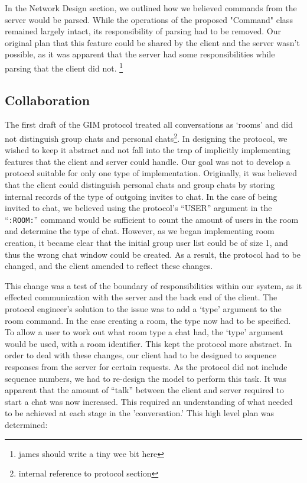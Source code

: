 In the Network Design section, we outlined how we believed commands from the server would be parsed. While the operations of the proposed "Command" class remained largely intact, its responsibility of parsing had to be removed. Our original plan that this feature could be shared by the client and the server wasn't possible, as it was apparent that the server had some responsibilities while parsing that the client did not. \footnote{james should write a tiny wee bit here}


\subsection{Collaboration}

The first draft of the GIM protocol treated all conversations as `rooms' and did not distinguish group chats and personal chats\footnote{internal reference to protocol section}. In designing the protocol, we wished to keep it abstract and not fall into the trap of implicitly implementing features that the client and server could handle. Our goal was not to develop a protocol suitable for only one type of implementation. Originally, it was believed that the client could distinguish personal chats and group chats by storing internal records of the type of outgoing invites to chat. In the case of being invited to chat, we believed using the protocol's ``USER'' argument in the ``\texttt{:ROOM:}'' command would be sufficient to count the amount of users in the room and determine the type of chat. However, as we began implementing room creation, it became clear that the initial group user list could be of size 1, and thus the wrong chat window could be created. As a result, the protocol had to be changed, and the client amended to reflect these changes. 

This change was a test of the boundary of responsibilities within our system, as it effected communication with the server and the back end of the client. The protocol engineer's solution to the issue was to add a `type' argument to the room command. In the case creating a room, the type now had to be specified. To allow a user to work out what room type a chat had, the `type' argument would be used, with a room identifier. This kept the protocol more abstract. In order to deal with these changes, our client had to be designed to sequence responses from the server for certain requests. As the protocol did not include sequence numbers, we had to re-design the model to perform this task. It was apparent that the amount of ``talk'' between the client and server required to start a chat was now increased. This required an understanding of what needed to be achieved at each stage in the 'conversation.' This high level plan was determined:

